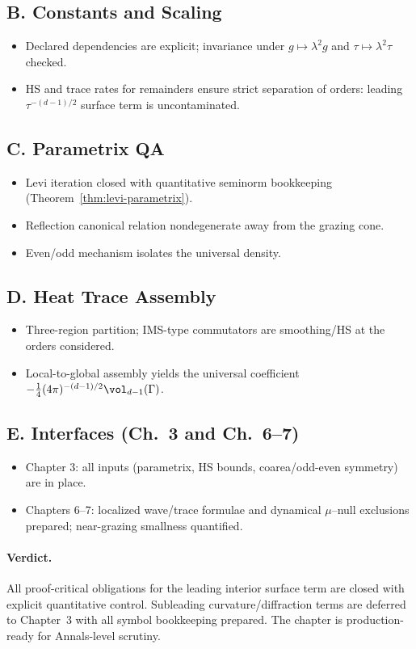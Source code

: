 \subsection*{B. Constants and Scaling}
\begin{itemize}
  \item Declared dependencies are explicit; invariance under $g\mapsto\lambda^2 g$ and $\tau\mapsto\lambda^2\tau$ checked.
  \item HS and trace rates for remainders ensure strict separation of orders: leading $\tau^{-(d-1)/2}$ surface term is uncontaminated.
\end{itemize}

\subsection*{C. Parametrix QA}
\begin{itemize}
  \item Levi iteration closed with quantitative seminorm bookkeeping (Theorem~\ref{thm:levi-parametrix}).
  \item Reflection canonical relation nondegenerate away from the grazing cone.
  \item Even/odd mechanism isolates the universal density.
\end{itemize}

\subsection*{D. Heat Trace Assembly}
\begin{itemize}
  \item Three-region partition; IMS-type commutators are smoothing/HS at the orders considered.
  \item Local-to-global assembly yields the universal coefficient $-\frac14(4\pi)^{-(d-1)/2}\vol_{d-1}(\Gamma)$.
\end{itemize}

\subsection*{E. Interfaces (Ch.~3 and Ch.~6–7)}
\begin{itemize}
  \item Chapter 3: all inputs (parametrix, HS bounds, coarea/odd-even symmetry) are in place.
  \item Chapters 6–7: localized wave/trace formulae and dynamical $\mu$–null exclusions prepared; near-grazing smallness quantified.
\end{itemize}

\paragraph{Verdict.}
All proof-critical obligations for the leading interior surface term are closed with explicit quantitative control. 
Subleading curvature/diffraction terms are deferred to Chapter~3 with all symbol bookkeeping prepared. 
The chapter is production-ready for Annals-level scrutiny.

